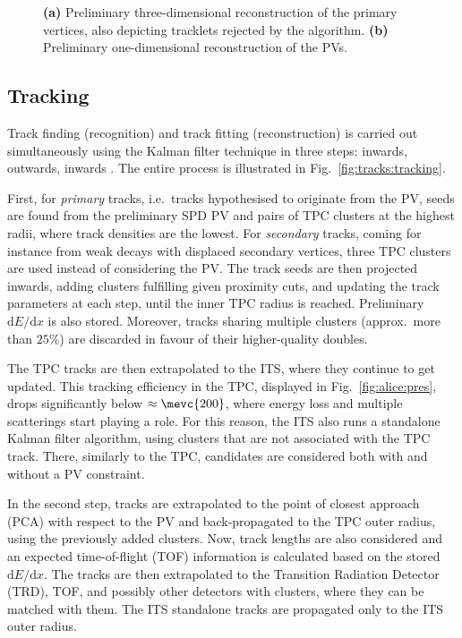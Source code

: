 \begin{figure}%
\hspace{3em}
\caption{\textbf{(a)} Preliminary three-dimensional reconstruction of the primary vertices, also depicting tracklets rejected by the algorithm. \textbf{(b)} Preliminary one-dimensional reconstruction of the PVs. \cite{alicedatapreparationgroupALICEDataFlow2018}}
\label{fig:tracks:pvfirst}
\end{figure}

\subsection{Tracking}

Track finding (recognition) and track fitting (reconstruction) is carried out simultaneously using the Kalman filter technique in three steps: inwards, outwards, inwards \cite{arslandokTrackReconstructionHighDensity2022}. The entire process is illustrated in Fig.~\ref{fig:tracks:tracking}. 

First, for \textit{primary} tracks, i.e.\ tracks hypothesised to originate from the PV, seeds are found from the preliminary SPD PV and pairs of TPC clusters at the highest radii, where track densities are the lowest. For \textit{secondary} tracks, coming for instance from weak decays with displaced secondary vertices, three TPC clusters are used instead of considering the PV. The track seeds are then projected inwards, adding clusters fulfilling given proximity cuts, and updating the track parameters at each step, until the inner TPC radius is reached. Preliminary $\mathrm{d}E/\mathrm{d}x$ is also stored. Moreover, tracks sharing multiple clusters (approx.\ more than $25\%$) are discarded in favour of their higher-quality doubles. 

The TPC tracks are then extrapolated to the ITS, where they continue to get updated. This tracking efficiency in the TPC, displayed in Fig.~\ref{fig:alice:pres}, drops significantly below $\approx \mevc{200}$, where energy loss and multiple scatterings start playing a role. For this reason, the ITS also runs a standalone Kalman filter algorithm, using clusters that are not associated with the TPC track. There, similarly to the TPC, candidates are considered both with and without a PV constraint.

In the second step, tracks are extrapolated to the point of closest approach (PCA) with respect to the PV and back-propagated to the TPC outer radius, using the previously added clusters. Now, track lengths are also considered and an expected time-of-flight (TOF) information is calculated based on the stored $\mathrm{d}E/\mathrm{d}x$. The tracks are then extrapolated to the Transition Radiation Detector (TRD), TOF, and possibly other detectors with clusters, where they can be matched with them. The ITS standalone tracks are propagated only to the ITS outer radius.

